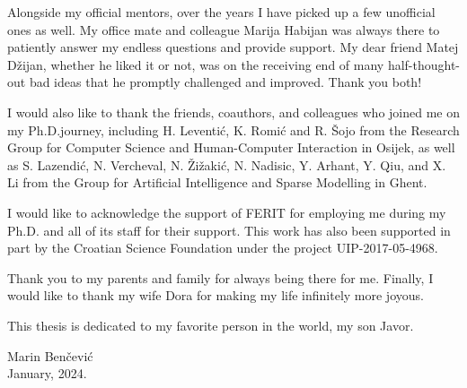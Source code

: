 \begin{acknowledgements}
Alongside my official mentors, over the years I have picked up a few unofficial ones as well. My office mate and colleague Marija Habijan was always there to patiently answer my endless questions and provide support. My dear friend Matej Džijan, whether he liked it or not, was on the receiving end of many half-thought-out bad ideas that he promptly challenged and improved. Thank you both!

I would also like to thank the friends, coauthors, and colleagues who joined me on my Ph.D.\@ journey, including H. Leventić, K. Romić and R. Šojo from the Research Group for Computer Science and Human-Computer Interaction in Osijek, as well as S. Lazendić, N. Vercheval, N. Žižakić, N. Nadisic, Y. Arhant, Y. Qiu, and X. Li from the Group for Artificial Intelligence and Sparse Modelling in Ghent. 

I would like to acknowledge the support of FERIT for employing me during my Ph.D. and all of its staff for their support. This work has also been supported in part by the Croatian Science Foundation under the project UIP-2017-05-4968.

Thank you to my parents and family for always being there for me. Finally, I would like to thank my wife Dora for making my life infinitely more joyous. 

This thesis is dedicated to my favorite person in the world, my son Javor.

\setlength{\epigraphwidth}{0.3\textwidth}
\renewcommand{\epigraphflush}{flushright}
 \epigraph{
Marin Benčević\\
January, 2024.
}{}
\end{acknowledgements}
